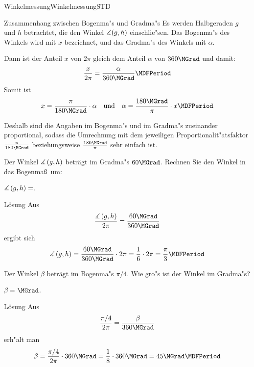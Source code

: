 \begin{MXContent}{Winkelmessung}{Winkelmessung}{STD}
\begin{MXInfo}{Zusammenhang zwischen Bogenma"s und Gradma"s}
Es werden Halbgeraden $g$ und $h$ betrachtet, die den Winkel 
$\measuredangle(g,h)$ einschlie"sen. Das Bogenma"s des Winkels wird mit $x$ 
bezeichnet, und das Gradma"s des Winkels mit $\alpha$. 

Dann ist der Anteil $x$ von $2\pi$ gleich dem Anteil $\alpha$ von 
$360\MGrad$ und damit: 
\[
   \frac{x}{2\pi} = \frac{\alpha}{360\MGrad} \MDFPeriod
\]
Somit ist 
\[
x = \frac{\pi}{180\MGrad} \cdot \alpha %
\quad\text{und}\quad
\alpha = \frac{180\MGrad}{\pi} \cdot x \MDFPeriod
\]
\end{MXInfo}
Deshalb sind die Angaben im Bogenma"s und im Gradma"s zueinander proportional,
sodass die Umrechnung mit dem jeweiligen Proportionalit"atsfaktor 
$\frac{\pi}{180\MGrad}$ beziehungsweise $\frac{180\MGrad}{\pi}$ 
sehr einfach ist.

\begin{MExercise}
Der Winkel $\measuredangle\left(g, h\right)$ betr\"agt im Gradma"s $60\MGrad$.
Rechnen Sie den Winkel in das Bogenma\ss\ um:
\par
$\measuredangle\left(g, h\right)=$.
\par
{}
\par
\begin{MHint}{L\"osung}
Aus
\[
\frac{\Mmeasuredangle\left(g, h\right)}{2\pi} %
= \frac{60\MGrad}{360\MGrad} %
\]
ergibt sich
\[
 \Mmeasuredangle\left(g, h\right) %
= \frac{60\MGrad}{360\MGrad}\cdot 2\pi %
= \frac{1}{6}\cdot 2\pi=\frac{\pi}{3}\MDFPeriod 
\]
\end{MHint}

\end{MExercise}

\begin{MExercise}
Der Winkel $\beta$ betr\"agt im Bogenma"s $\pi/4$. Wie gro"s ist der 
Winkel im Gradma"s?

\par
$\beta=$$\MGrad$.
\par
\begin{MHint}{L\"osung}
Aus
\[
\frac{\pi/4}{2\pi} = \frac{\beta}{360\MGrad} %
\]
erh"alt man
\[
\beta %
 = \frac{\pi/4}{2\pi}\cdot 360\MGrad %
 = \frac{1}{8}\cdot 360\MGrad %
 = 45\MGrad \MDFPeriod %
\]
\end{MHint}
\end{MExercise}


\end{MXContent}
